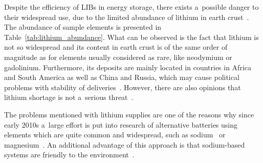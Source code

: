 Despite the efficiency of LIBs in energy storage, there exists a~possible danger to their widespread use, due to the limited abundance of lithium in earth crust~\cite{lithium-abundance}. The abundance of sample elements is presented in Table~\ref{tab:lithium_abundance}. What can be observed is the fact that lithium is not so widespread and its content in earth crust is of the same order of magnitude as for elements usually considered as rare, like neodymium or gadolinium. Furthermore, its deposits are mainly located in countries in Africa and South America as well as China and Russia, which may cause political problems with stability of deliveries~\cite{lithium-shortage}. However, there are also opinions that lithium shortage is not a~serious threat~\cite{lithium-contra}.

The problems mentioned with lithium supplies are one of the reasons why since early 2010s a~large effort is put into research of alternative batteries using elements which are quite common and widespread, such as sodium~\cite{na-ion-1,na-ion-2,na-ion-3,na-ion-4,na-ion-5} or magnesium~\cite{mg-ion-1,mg-ion-2,mg-ion-3,mg-ion-4,mg-ion-5,mg-ion-6,mg-ion-7,mg-ion-8,mg-ion-9}. An additional advantage of this approach is that sodium-based systems are friendly to the environment~\cite{na-environment}.


